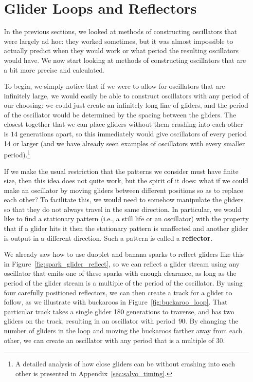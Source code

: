 \section{Glider Loops and Reflectors}\label{sec:glider_loops}

In the previous sections, we looked at methods of constructing oscillators that were largely ad hoc: they worked sometimes, but it was almost impossible to actually predict when they would work or what period the resulting oscillators would have. We now start looking at methods of constructing oscillators that are a bit more precise and calculated.

To begin, we simply notice that if we were to allow for oscillators that are infinitely large, we would easily be able to construct oscillators with any period of our choosing: we could just create an infinitely long line of gliders, and the period of the oscillator would be determined by the spacing between the gliders. The closest together that we can place gliders without them crashing into each other is $14$ generations apart, so this immediately would give oscillators of every period 14 or larger (and we have already seen examples of oscillators with every smaller period).\footnote{A detailed analysis of how close gliders can be without crashing into each other is presented in Appendix~\ref{sec:salvo_timing}.}

If we make the usual restriction that the patterns we consider must have finite size, then this idea does not quite work, but the spirit of it does: what if we could make an oscillator by moving gliders between different positions so as to replace each other? To facilitate this, we would need to somehow manipulate the gliders so that they do not always travel in the same direction. In particular, we would like to find a stationary pattern (i.e., a still life or an oscillator) with the property that if a glider hits it then the stationary pattern is unaffected and another glider is output in a different direction. Such a pattern is called a \textbf{reflector}.

We already saw how to use duoplet and banana sparks to reflect gliders like this in Figure~\ref{fig:spark_glider_reflect}, so we can reflect a glider stream using any oscillator that emits one of these sparks with enough clearance, as long as the period of the glider stream is a multiple of the period of the oscillator. By using four carefully positioned reflectors, we can then create a track for a glider to follow, as we illustrate with buckaroos in Figure~\ref{fig:buckaroo_loop}. That particular track takes a single glider 180 generations to traverse, and has two gliders on the track, resulting in an oscillator with period~$90$. By changing the number of gliders in the loop and moving the buckaroos farther away from each other, we can create an oscillator with any period that is a multiple of $30$.

